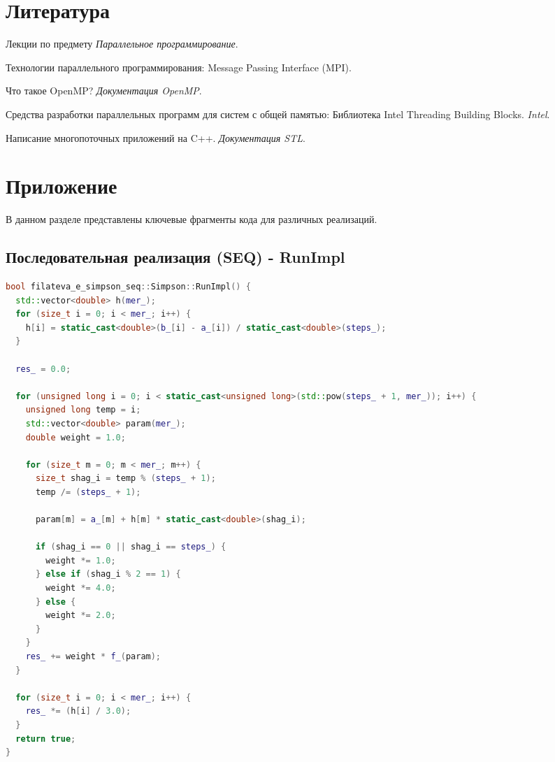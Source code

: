 \documentclass[12pt]{article}
\begin{document}
\newpage
\section{Литература}
\begin{thebibliography}{99}
    Лекции по предмету \textit{Параллельное программирование}.

    Технологии параллельного программирования: Message Passing Interface (MPI).

    Что такое OpenMP? \textit{Документация OpenMP}.

    Средства разработки параллельных программ для систем с общей памятью: Библиотека Intel Threading Building Blocks. \textit{Intel}.

    Написание многопоточных приложений на C++. \textit{Документация STL}.
\end{thebibliography}

\newpage
\section{Приложение}

В данном разделе представлены ключевые фрагменты кода для различных реализаций.

\subsection{Последовательная реализация (SEQ) - RunImpl}
\begin{lstlisting}[language=C++]
bool filateva_e_simpson_seq::Simpson::RunImpl() {
  std::vector<double> h(mer_);
  for (size_t i = 0; i < mer_; i++) {
    h[i] = static_cast<double>(b_[i] - a_[i]) / static_cast<double>(steps_);
  }

  res_ = 0.0;

  for (unsigned long i = 0; i < static_cast<unsigned long>(std::pow(steps_ + 1, mer_)); i++) {
    unsigned long temp = i;
    std::vector<double> param(mer_);
    double weight = 1.0;

    for (size_t m = 0; m < mer_; m++) {
      size_t shag_i = temp % (steps_ + 1);
      temp /= (steps_ + 1);

      param[m] = a_[m] + h[m] * static_cast<double>(shag_i);

      if (shag_i == 0 || shag_i == steps_) {
        weight *= 1.0;
      } else if (shag_i % 2 == 1) {
        weight *= 4.0;
      } else {
        weight *= 2.0;
      }
    }
    res_ += weight * f_(param);
  }
  
  for (size_t i = 0; i < mer_; i++) {
    res_ *= (h[i] / 3.0);
  }
  return true;
}
\end{lstlisting}
\newpage
\end{document}
